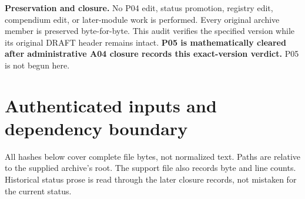 \documentclass[11pt]{article}
\begin{document}
\textbf{Preservation and closure.}
No P04 edit, status promotion, registry edit, compendium edit, or later-module
work is performed. Every original archive member is preserved byte-for-byte.
This audit verifies the specified version while its original DRAFT header
remains intact. \textbf{P05 is mathematically cleared after administrative
A04 closure records this exact-version verdict.} P05 is not begun here.

\section{Authenticated inputs and dependency boundary}
All hashes below cover complete file bytes, not normalized text. Paths are
relative to the supplied archive's  root.
The support file  also records byte and
line counts. Historical status prose is read through the later closure
records, not mistaken for the current status.
\end{document}
